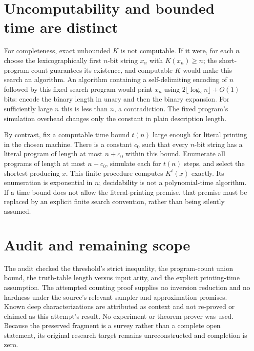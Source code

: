 \documentclass[11pt]{article}
\begin{document}
\section{Uncomputability and bounded time are distinct}
For completeness, exact unbounded $K$ is not computable.
If it were, for each $n$ choose the lexicographically first
$n$-bit string $x_n$ with $K(x_n)\ge n$; the short-program
count guarantees its existence, and computable $K$ would make
this search an algorithm. An algorithm containing a self-delimiting
encoding of $n$ followed by this fixed search program would
print $x_n$ using $2\lfloor\log_2n\rfloor+O(1)$ bits: encode
the binary length in unary and then the binary expansion.
For sufficiently large $n$ this is less than $n$, a contradiction.
The fixed program's simulation overhead changes only the constant
in plain description length.

By contrast, fix a computable time bound $t(n)$ large enough
for literal printing in the chosen machine. There is a constant
$c_0$ such that every $n$-bit string has a literal program of
length at most $n+c_0$ within this bound. Enumerate all programs
of length at most $n+c_0$, simulate each for $t(n)$ steps,
and select the shortest producing $x$. This finite procedure
computes $K^t(x)$ exactly. Its enumeration is exponential in
$n$; decidability is not a polynomial-time algorithm. If a time
bound does not allow the literal-printing premise, that premise
must be replaced by an explicit finite search convention, rather
than being silently assumed.

\section{Audit and remaining scope}
The audit checked the threshold's strict inequality, the
program-count union bound, the truth-table length versus input
arity, and the explicit printing-time assumption. The attempted
counting proof supplies no inversion reduction and no hardness
under the source's relevant sampler and approximation promises.
Known deep characterizations are attributed as context and not
re-proved or claimed as this attempt's result. No experiment or
theorem prover was used. Because the preserved fragment is a
survey rather than a complete open statement, its original
research target remains unreconstructed and completion is zero.
\end{document}
